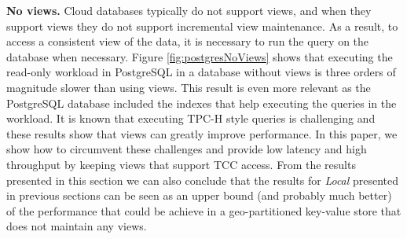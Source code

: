 \documentclass[sigplan,twocolumn,review,anonymous]{acmart}
\begin{document}
\noindent
\textbf{No views.} %
Cloud databases typically do not support views, and when they support views they do not support incremental view maintenance.
As a result, to access a consistent view of the data, it is necessary to run the query on the database when necessary.
Figure \ref{fig:postgresNoViews} shows that executing the read-only workload in PostgreSQL in 
a database without views is three orders of magnitude slower than using views.
This result is even more relevant as the PostgreSQL database included the indexes that help executing the
queries in the workload. 
It is known that executing TPC-H style queries is challenging \cite{dreseler20quantifying} and these 
results show that views can greatly improve performance. 
In this paper, we show how to circumvent these challenges and provide low latency and high throughput 
by keeping views that support TCC access.
From the results presented in this section we can also conclude that the results for \textit{Local} presented in previous sections can be seen
as an upper bound (and probably much better) of the performance that could be achieve in a geo-partitioned key-value store that 
does not maintain any views. 


\end{document}
